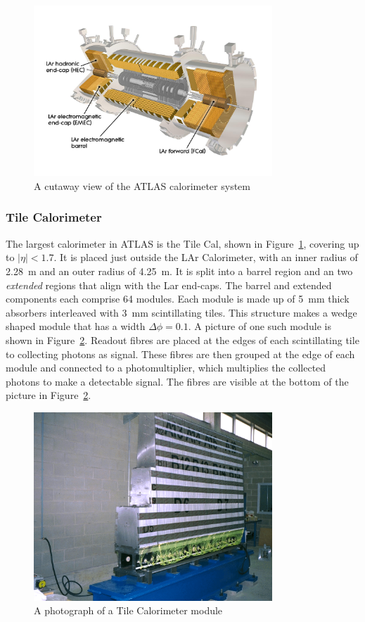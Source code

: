 \begin{figure}[!h]
	\centering
   \includegraphics[width=0.8\textwidth]{figures/larCal.jpg}
	\caption{A cutaway view of the ATLAS calorimeter system}
	\label{fig:larCal}
\end{figure}

\subsubsection{Tile Calorimeter}
\par The largest calorimeter in ATLAS is the Tile Cal, shown in Figure~\ref{fig:larCal},
  covering up to $|\eta|<1.7$. It is placed 
just outside the LAr Calorimeter, with an inner radius of \SI{2.28}{\m}  and an outer 
radius of \SI{4.25}{\m}. It is split into a barrel region and an two {\it extended}
regions that align with the Lar end-caps. The barrel and extended components each comprise 64 modules.
 Each module is made up of \SI{5}{\mm} thick  absorbers 
interleaved with \SI{3}{\mm} scintillating tiles. This structure makes a wedge shaped module 
that has a width $\Delta\phi=0.1$. A picture of one such module is shown in Figure~\ref{fig:tileCalmodule}.
Readout fibres are placed at the edges of each scintillating tile to collecting photons as signal. These 
fibres are then grouped at the edge of each module and connected to a photomultiplier, 
which multiplies the collected photons to make a detectable signal. The fibres are visible at the bottom 
of the picture in Figure~\ref{fig:tileCalmodule}. 

\begin{figure}[!h]
	\centering
   \includegraphics[width=0.8\textwidth]{figures/tileCalmodule.png}
	\caption{A photograph of a Tile Calorimeter module}
	\label{fig:tileCalmodule}
\end{figure}
